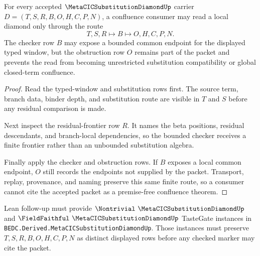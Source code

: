 \begin{theorem}
\label{thm:metacic-substitution-diamond-confluence-obligation}
For every accepted $\MetaCICSubstitutionDiamondUp$ carrier $D=(T,S,R,B,O,H,C,P,N)$, a confluence consumer may read a local diamond only through the route
$$
T,S,R \longmapsto B \longmapsto O,H,C,P,N .
$$
The checker row $B$ may expose a bounded common endpoint for the displayed typed window, but the obstruction row $O$ remains part of the packet and prevents the read from becoming unrestricted substitution compatibility or global closed-term confluence.
\end{theorem}
\begin{proof}
Read the typed-window and substitution rows first. The source term, branch data, binder depth, and substitution route are visible in $T$ and $S$ before any residual comparison is made.

Next inspect the residual-frontier row $R$. It names the beta positions, residual descendants, and branch-local dependencies, so the bounded checker receives a finite frontier rather than an unbounded substitution algebra.

Finally apply the checker and obstruction rows. If $B$ exposes a local common endpoint, $O$ still records the endpoints not supplied by the packet. Transport, replay, provenance, and naming preserve this same finite route, so a consumer cannot cite the accepted packet as a premise-free confluence theorem.
\end{proof}

Lean follow-up must provide $\Nontrivial\ \MetaCICSubstitutionDiamondUp$ and $\FieldFaithful\ \MetaCICSubstitutionDiamondUp$ TasteGate instances in \texttt{BEDC.Derived.MetaCICSubstitutionDiamondUp}. Those instances must preserve $T,S,R,B,O,H,C,P,N$ as distinct displayed rows before any checked marker may cite the packet.


